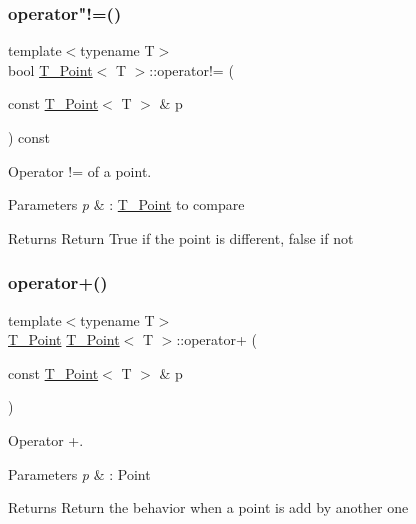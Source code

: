 \subsubsection{\texorpdfstring{operator"!=()}{operator!=()}}
{\footnotesize\ttfamily template$<$typename T$>$ \\
bool \hyperlink{classT__Point}{T\+\_\+\+Point}$<$ T $>$\+::operator!= (\begin{DoxyParamCaption}\item[{const \hyperlink{classT__Point}{T\+\_\+\+Point}$<$ T $>$ \&}]{p }\end{DoxyParamCaption}) const\hspace{0.3cm}{\ttfamily [inline]}}



Operator != of a point. 


\begin{DoxyParams}{Parameters}
{\em p} & \+: \hyperlink{classT__Point}{T\+\_\+\+Point} to compare \\
\hline
\end{DoxyParams}
\begin{DoxyReturn}{Returns}
Return True if the point is different, false if not 
\end{DoxyReturn}
\mbox{\label{classT__Point_a1f94a7a19cc8711e7784f700ea59297a}} 
\subsubsection{\texorpdfstring{operator+()}{operator+()}}
{\footnotesize\ttfamily template$<$typename T$>$ \\
\hyperlink{classT__Point}{T\+\_\+\+Point} \hyperlink{classT__Point}{T\+\_\+\+Point}$<$ T $>$\+::operator+ (\begin{DoxyParamCaption}\item[{const \hyperlink{classT__Point}{T\+\_\+\+Point}$<$ T $>$ \&}]{p }\end{DoxyParamCaption})\hspace{0.3cm}{\ttfamily [inline]}}



Operator +. 


\begin{DoxyParams}{Parameters}
{\em p} & \+: Point \\
\hline
\end{DoxyParams}
\begin{DoxyReturn}{Returns}
Return the behavior when a point is add by another one 
\end{DoxyReturn}
\mbox{\label{classT__Point_a4fa7b8ceb837c81e608d5ddad0f1ffe7}} 
